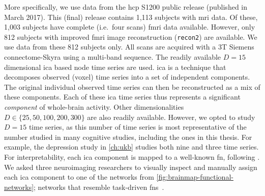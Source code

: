More specifically, we use data from the \gls{hcp} S1200 public release (published in March 2017).
This (final) release contains 1,113 subjects with \gls{mri} data.
Of these, 1,003 subjects have complete (i.e.~four scans) \gls{fmri} data available.
However, only 812 subjects with improved \gls{fmri} image reconstruction (\texttt{recon2}) are available.
We use data from these 812 subjects only.
All scans are acquired with a 3T Siemens connectome-Skyra using a multi-band sequence.
%
The readily available $D = 15$ dimensional \gls{ica} based node time series are used.
\Gls{ica} is a technique that decomposes observed (voxel) time series into a set of independent components.
The original individual observed time series can then be reconstructed as a mix of these components.
Each of these \gls{ica} time series thus represents a significant \emph{component} of whole-brain activity.
Other dimensionalities $D \in \{25,50,100,200,300\}$ are also readily available.
However, we opted to study $D = 15$ time series, as this number of time series is most representative of the number studied in many cognitive studies, including the ones in this thesis.
For example, the depression study in \cref{ch:ukb} studies both nine and three time series.
%
For interpretability, each \gls{ica} component is mapped to a well-known \gls{fn}, following \textcite{Giorgio2018}.
We asked three neuroimaging researchers to visually inspect and manually assign each \gls{ica} component to one of the networks from \cref{fig:brainmap-functional-networks}; networks that resemble task-driven \glspl{fn}~\parencite{Fox2007, Smith2009}.


\captionsetup[subfigure]{labelformat=empty}

